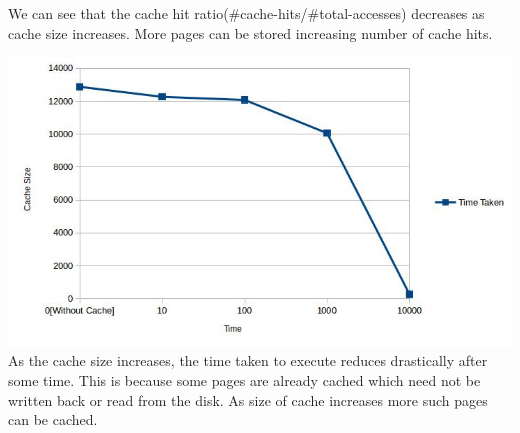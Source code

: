 \documentclass[11pt]{article}
\begin{document}
We can see that the cache hit ratio(\#cache-hits/\#total-accesses) decreases as cache size increases. More pages can be stored increasing number of cache hits.


\includegraphics[scale = 0.50]{images/cache2.png}\\

As the cache size increases, the time taken to execute reduces drastically after some time. This is because some pages are already cached which need not be written back or read from the disk. As size of cache increases more such pages can be cached.
\end{document}
